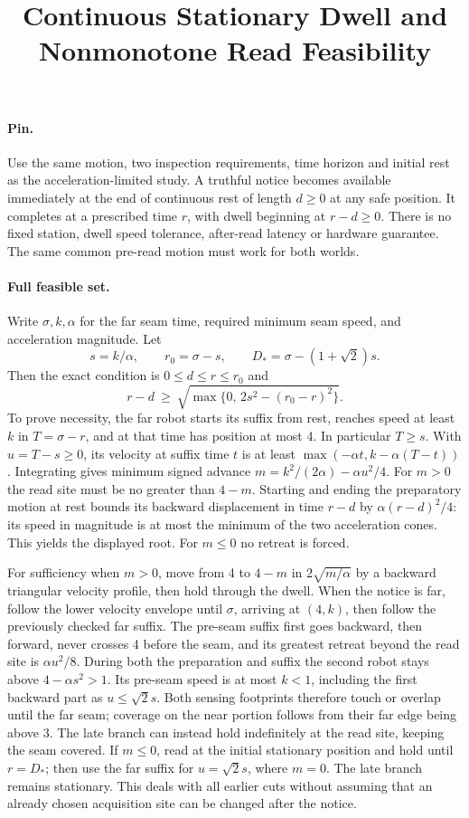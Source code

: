 \documentclass{article}
\title{Continuous Stationary Dwell and Nonmonotone Read Feasibility}
\begin{document}
\maketitle
\paragraph{Pin.} Use the same motion, two inspection requirements,
time horizon and initial rest as the acceleration-limited study.
A truthful notice becomes available immediately at the end of
continuous rest of length \(d\ge0\) at any safe position. It
completes at a prescribed time \(r\), with dwell beginning at
\(r-d\ge0\). There is no fixed station, dwell speed tolerance,
after-read latency or hardware guarantee. The same common
pre-read motion must work for both worlds.

\paragraph{Full feasible set.}
Write \(\sigma,k,\alpha\) for the far seam time, required minimum
seam speed, and acceleration magnitude. Let
\[
 s=k/\alpha,\qquad r_0=\sigma-s,\qquad
 D_*=\sigma-(1+\sqrt2)s.
\]
Then the exact condition is \(0\le d\le r\le r_0\) and
\[
 r-d\ \ge\
 \sqrt{\max\{0,\,2s^2-(r_0-r)^2\}}.
\]
To prove necessity, the far robot starts its suffix from rest,
reaches speed at least \(k\) in \(T=\sigma-r\), and at that time
has position at most 4. In particular \(T\ge s\).
With \(u=T-s\ge0\), its velocity at suffix time \(t\) is at least
\(\max(-\alpha t, k-\alpha(T-t))\). Integrating gives minimum
signed advance \(m=k^2/(2\alpha)-\alpha u^2/4\).
For \(m>0\) the read site must be no greater than \(4-m\).
Starting and ending the preparatory motion at rest bounds
its backward displacement in time \(r-d\) by
\(\alpha(r-d)^2/4\): its speed in magnitude is at most
the minimum of the two acceleration cones. This yields
the displayed root. For \(m\le0\) no retreat is forced.

For sufficiency when \(m>0\), move from 4 to \(4-m\) in
\(2\sqrt{m/\alpha}\) by a backward triangular velocity profile,
then hold through the dwell. When the notice is far, follow
the lower velocity envelope until \(\sigma\), arriving at
\((4,k)\), then follow the previously checked far suffix.
The pre-seam suffix first goes backward, then forward, never
crosses 4 before the seam, and its greatest retreat beyond
the read site is \(\alpha u^2/8\). During both the preparation
and suffix the second robot stays above \(4-\alpha s^2>1\).
Its pre-seam speed is at most \(k<1\), including the
first backward part as \(u\le\sqrt2s\). Both sensing footprints
therefore touch or overlap until the far seam; coverage on the
near portion follows from their far edge being above 3.
The late branch can instead hold indefinitely at the read
site, keeping the seam covered. If \(m\le0\), read at the
initial stationary position and hold until \(r=D_*\);
then use the far suffix for \(u=\sqrt2s\), where \(m=0\).
The late branch remains stationary. This deals with all earlier
cuts without assuming that an already chosen acquisition site
can be changed after the notice.
\end{document}
